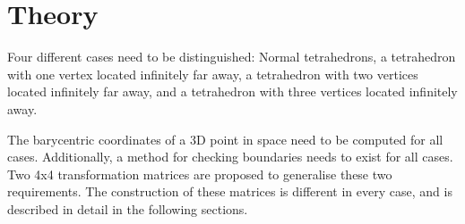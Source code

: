 \section{Theory}

Four   different  cases  need  to  be  distinguished:  Normal  tetrahedrons,   a
tetrahedron with one vertex located infinitely far away, a  tetrahedron with two
vertices  located  infinitely  far  away,  and a tetrahedron with three vertices
located infinitely away.

The barycentric coordinates of a 3D point in space  need  to be computed for all
cases. Additionally, a method  for  checking  boundaries  needs to exist for all
cases. Two 4x4 transformation  matrices  are  proposed  to  generalise these two
requirements. The construction of these matrices is different in every case, and
is described in detail in the following sections.




